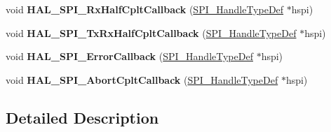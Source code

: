 \begin{DoxyCompactItemize}
\item 
\mbox{\label{group___s_p_i___exported___functions___group2_gacf622756a3814edfacf449b5749b048a}} 
void {\bfseries H\+A\+L\+\_\+\+S\+P\+I\+\_\+\+Rx\+Half\+Cplt\+Callback} (\hyperlink{group___s_p_i___exported___types_gab3bd115785297692c125528b7293566b}{S\+P\+I\+\_\+\+Handle\+Type\+Def} $\ast$hspi)
\item 
\mbox{\label{group___s_p_i___exported___functions___group2_gab46e2325b0880d5b5a301792438b151b}} 
void {\bfseries H\+A\+L\+\_\+\+S\+P\+I\+\_\+\+Tx\+Rx\+Half\+Cplt\+Callback} (\hyperlink{group___s_p_i___exported___types_gab3bd115785297692c125528b7293566b}{S\+P\+I\+\_\+\+Handle\+Type\+Def} $\ast$hspi)
\item 
\mbox{\label{group___s_p_i___exported___functions___group2_ga3db7835e7e7ac335887f62fedf156926}} 
void {\bfseries H\+A\+L\+\_\+\+S\+P\+I\+\_\+\+Error\+Callback} (\hyperlink{group___s_p_i___exported___types_gab3bd115785297692c125528b7293566b}{S\+P\+I\+\_\+\+Handle\+Type\+Def} $\ast$hspi)
\item 
\mbox{\label{group___s_p_i___exported___functions___group2_ga4a2593ec36fa4def11929e65f631f3cf}} 
void {\bfseries H\+A\+L\+\_\+\+S\+P\+I\+\_\+\+Abort\+Cplt\+Callback} (\hyperlink{group___s_p_i___exported___types_gab3bd115785297692c125528b7293566b}{S\+P\+I\+\_\+\+Handle\+Type\+Def} $\ast$hspi)
\end{DoxyCompactItemize}


\subsection{Detailed Description}
